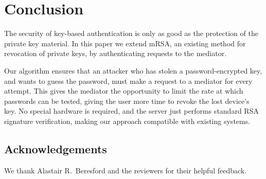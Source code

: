 \documentclass{llncs}
\begin{document}
\section{Conclusion}

The security of key-based authentication is only as good as the protection of the private key
material. In this paper we extend mRSA, an existing method for revocation of private keys, by
authenticating requests to the mediator.

Our algorithm ensures that an attacker who has stolen a password-encrypted key, and wants to guess
the password, must make a request to a mediator for every attempt. This gives the mediator the
opportunity to limit the rate at which passwords can be tested, giving the user more time to revoke
the lost device's key. No special hardware is required, and the server just performs standard RSA
signature verification, making our approach compatible with existing systems.

\subsection*{Acknowledgements}

We thank Alastair R.\ Beresford and the reviewers for their helpful feedback.


{}
\end{document}
